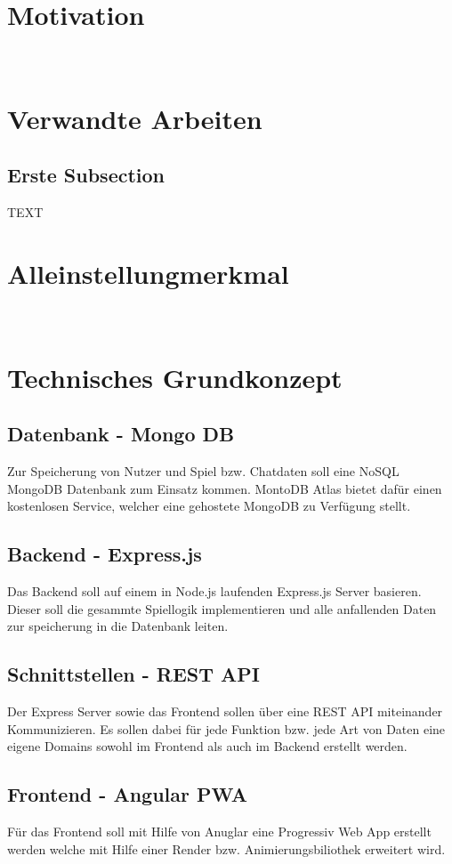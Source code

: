 \documentclass[conference]{IEEEtran}
\begin{document}
	\section{Motivation}
	\ \\

	\section{Verwandte Arbeiten}
	\subsection{Erste Subsection}
	TEXT
	\ \\

	\section{Alleinstellungmerkmal}
	\ \\

	\section{Technisches Grundkonzept}
	\subsection{Datenbank - Mongo DB}
	Zur Speicherung von Nutzer und Spiel bzw. Chatdaten soll eine NoSQL MongoDB Datenbank zum Einsatz kommen. MontoDB Atlas bietet dafür einen kostenlosen Service, welcher eine gehostete MongoDB zu Verfügung stellt.

	\subsection{Backend - Express.js}
	Das Backend soll auf einem in Node.js laufenden Express.js Server basieren. Dieser soll die gesammte Spiellogik implementieren und alle anfallenden Daten zur speicherung in die Datenbank leiten.

	\subsection{Schnittstellen - REST API}
	Der Express Server sowie das Frontend sollen über eine REST API miteinander Kommunizieren. Es sollen dabei für jede Funktion bzw. jede Art von Daten eine eigene Domains sowohl im Frontend als auch im Backend erstellt werden.
	
	\subsection{Frontend - Angular PWA}
	Für das Frontend soll mit Hilfe von Anuglar eine Progressiv Web App erstellt werden welche mit Hilfe einer Render bzw. Animierungsbiliothek erweitert wird.
\end{document}
